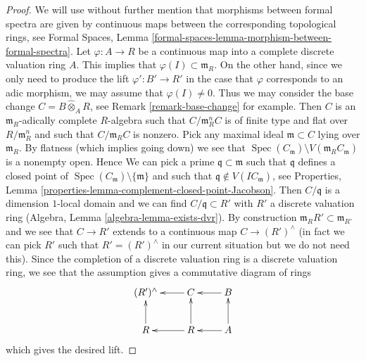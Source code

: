 \documentclass[10pt,a4paper]{amsart}
\theoremstyle{plain}
\theoremstyle{definition}
\theoremstyle{remark}
\numberwithin{equation}{subsection}
\def\Spec{\mathop{\mathrm{Spec}}}
\begin{document}
\begin{proof}
We will use without further mention that morphisms between formal spectra
are given by continuous maps between the corresponding topological rings, see
Formal Spaces, Lemma \ref{formal-spaces-lemma-morphism-between-formal-spectra}.
Let $\varphi : A \to R$ be a continuous map into a complete discrete
valuation ring $A$. This implies that $\varphi(I) \subset \mathfrak m_R$.
On the other hand, since we only need to produce the lift
$\varphi' : B' \to R'$ in the case that $\varphi$ corresponds to an adic
morphism, we may assume that $\varphi(I) \not = 0$. Thus we may consider
the base change $C = B \widehat{\otimes}_A R$, see
Remark \ref{remark-base-change} for example.
Then $C$ is an $\mathfrak m_R$-adically complete $R$-algebra
such that $C/\mathfrak m_R^n C$ is of finite type and flat over
$R/\mathfrak m_R^n$ and such that $C/\mathfrak m_R C$ is nonzero.
Pick any maximal ideal $\mathfrak m \subset C$ lying over
$\mathfrak m_R$. By flatness (which implies going down) we see that
$\Spec(C_\mathfrak m) \setminus V(\mathfrak m_R C_\mathfrak m)$
is a nonempty open. Hence
We can pick a prime $\mathfrak q \subset \mathfrak m$
such that $\mathfrak q$ defines a closed point of
$\Spec(C_\mathfrak m) \setminus \{\mathfrak m\}$ and such that
$\mathfrak q \not \in V(IC_\mathfrak m)$, see
Properties, Lemma \ref{properties-lemma-complement-closed-point-Jacobson}.
Then $C/\mathfrak q$ is a dimension $1$-local domain and we can find
$C/\mathfrak q \subset R'$ with $R'$ a discrete valuation ring
(Algebra, Lemma \ref{algebra-lemma-exists-dvr}).
By construction $\mathfrak m_R R' \subset \mathfrak m_{R'}$
and we see that $C \to R'$ extends to a continuous map
$C \to (R')^\wedge$ (in fact we can pick $R'$ such that
$R' = (R')^\wedge$ in our current situation but we do not need this).
Since the completion of a discrete valuation ring is a discrete
valuation ring, we see that the assumption gives a commutative
diagram of rings
$$
\xymatrix{
(R')^\wedge & C \ar[l] & B \ar[l] \\
R \ar[u] & R \ar[l] \ar[u] & A \ar[l] \ar[u]
}
$$
which gives the desired lift.
\end{proof}
\end{document}
